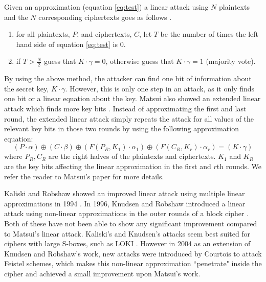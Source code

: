 Given an approximation (equation \ref{eq:test}) a linear attack using $N$ plaintexts and the $N$ corresponding ciphertexts goes as follows \cite{matsui1994linear}. 

\begin{enumerate}
	
	\item for all plaintexts, $P$, and ciphertexts, $C$, let $T$ be the number of times the left hand side of equation \ref{eq:test} is 0.
	\item if $T > \frac{N}{2}$ guess that $K \cdot \gamma = 0$, otherwise guess that $K \cdot \gamma = 1$ (majority vote).
	
\end{enumerate}
By using the above method, the attacker can find one bit of information about the secret key, $K \cdot \gamma$. However, this is only one step in an attack, as it only finds one bit or a linear equation about the key. Matsui also showed an extended linear attack which finds more key bits \cite{matsui1994linear}. Instead of approximating the first and last round, the extended linear attack simply repeats the attack for all values of the relevant key bits in those two rounds by using the following approximation equation: 
\begin{equation} \label{eq:linear2}
(P \cdot \alpha) \oplus (C \cdot \beta) \oplus (F(P_{R},K_{1}) \cdot \alpha_{1}) \oplus (F(C_{R},K_{r}) \cdot \alpha_{r}) = (K \cdot \gamma)
\end{equation}
where $P_{R}, C_{R}$ are the right halves of the plaintexts and ciphertexts. $K_{1}$ and $K_{R}$ are the key bits affecting the linear approximation in the first and $r$th rounds. We refer the reader to Matsui's paper \cite{matsui1994linear} for more details.

Kaliski and Robshaw showed an improved linear attack using multiple linear approximations in 1994 \cite{kaliski1994linear}. In 1996, Knudsen and Robshaw introduced a linear attack using non-linear approximations in the outer rounds of a block cipher \cite{kilian1996protect}. Both of these have not been able to show any significant improvement compared to Matsui's linear attack. Kaliski's and Knudsen's attacks seem best suited for ciphers with large S-boxes, such as LOKI \cite{brown1990loki,kilian1996protect}. However in 2004 as an extension of Knudsen and Robshaw's work, new attacks were introduced by Courtois \cite{courtois2004feistel} to attack Feistel schemes, which makes this non-linear approximation ``penetrate" inside the cipher and achieved a small improvement upon Matsui's work.

